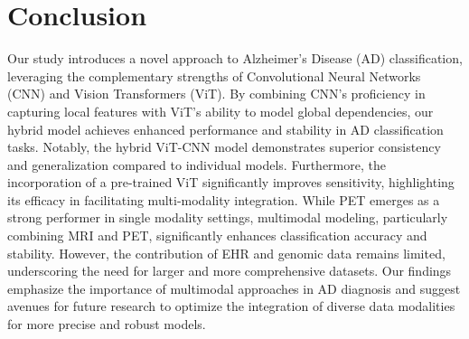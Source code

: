 \section{Conclusion}
Our study introduces a novel approach to Alzheimer’s Disease (AD) classification, leveraging the complementary strengths of Convolutional Neural Networks (CNN) and Vision Transformers (ViT). By combining CNN's proficiency in capturing local features with ViT's ability to model global dependencies, our hybrid model achieves enhanced performance and stability in AD classification tasks. Notably, the hybrid ViT-CNN model demonstrates superior consistency and generalization compared to individual models. Furthermore, the incorporation of a pre-trained ViT significantly improves sensitivity, highlighting its efficacy in facilitating multi-modality integration. While PET emerges as a strong performer in single modality settings, multimodal modeling, particularly combining MRI and PET, significantly enhances classification accuracy and stability. However, the contribution of EHR and genomic data remains limited, underscoring the need for larger and more comprehensive datasets. Our findings emphasize the importance of multimodal approaches in AD diagnosis and suggest avenues for future research to optimize the integration of diverse data modalities for more precise and robust models. 